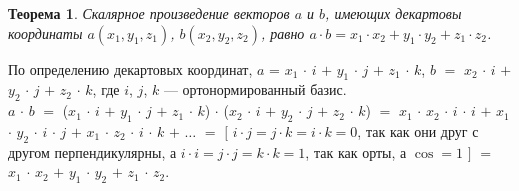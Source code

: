 \newtheorem*{th2_4}{Теорема}\begin{th2_4} Скалярное произведение векторов $a$ и $b$, имеющих декартовы координаты $a(x_1, y_1, z_1)$, $b(x_2, y_2, z_2)$, равно $a\cdot b = x_1\cdot x_2 + y_1\cdot y_2 + z_1 \cdot z_2$.
\end{th2_4}
\begin{Proof}
	По определению декартовых координат, $a$ = $x_1$ $\cdot$ $i$ $+$ $y_1$ $\cdot$ $j$ $+$ $z_1$ $\cdot$ $k$, $b$ $=$ $x_2$ $\cdot$ $i$ $+$ $y_2$ $\cdot$ $j$ $+$ $z_2$ $\cdot$ $k$,
	где $i$, $j$, $k$ --- ортонормированный базис.
	\\ $a$ $\cdot$ $b$ $=$ ($x_1$ $\cdot$ $i$ $+$ $y_1$ $\cdot$ $j$ $+$ $z_1$ $\cdot$ $k$) $\cdot$ ($x_2$ $\cdot$ $i$ $+$ $y_2$ $\cdot$ $j$ $+$ $z_2$ $\cdot$ $k$) $=$ $x_1$ $\cdot$ $x_2$ $\cdot$ $i$ $\cdot$ $i$ $+$ $x_1$ $\cdot$ $y_2$ $\cdot$ $i$ $\cdot$ $j$ $+$ $x_1$ $\cdot$ $z_2$ $\cdot$ $i$ $\cdot$ $k$ $+$ $\dots$ $=$ $[$ $i\cdot j = j\cdot k = i\cdot k = 0$, так как они друг с другом
	перпендикулярны, а $i\cdot i = j\cdot j = k\cdot k = 1$, так как орты, а $\cos = 1$ $]$ $=$
	$x_1$ $\cdot$ $x_2$ $+$ $y_1$ $\cdot$ $y_2$ $+$ $z_1$ $\cdot$ $z_2$.
\end{Proof}








